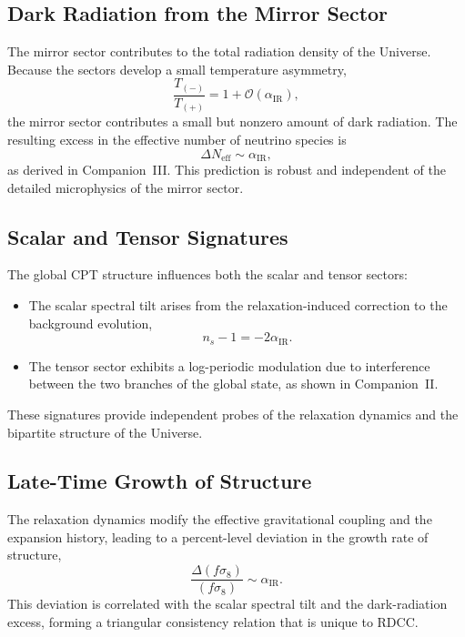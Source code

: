 \documentclass[11pt,a4paper]{article}
\begin{document}
\subsection{Dark Radiation from the Mirror Sector}

The mirror sector contributes to the total radiation density of the Universe. Because the sectors develop a small temperature asymmetry,
\begin{equation}
    \frac{T_{(-)}}{T_{(+)}} = 1 + \mathcal{O}(\alpha_{\mathrm{IR}}),
\end{equation}
the mirror sector contributes a small but nonzero amount of dark radiation. The resulting excess in the effective number of neutrino species is
\begin{equation}
    \Delta N_{\mathrm{eff}} \sim \alpha_{\mathrm{IR}},
\end{equation}
as derived in Companion~III. This prediction is robust and independent of the detailed microphysics of the mirror sector.

\subsection{Scalar and Tensor Signatures}

The global CPT structure influences both the scalar and tensor sectors:
\begin{itemize}
    \item The scalar spectral tilt arises from the relaxation-induced correction to the background evolution,
    \begin{equation}
        n_s - 1 = -2\alpha_{\mathrm{IR}}.
    \end{equation}
    \item The tensor sector exhibits a log-periodic modulation due to interference between the two branches of the global state, as shown in Companion~II.
\end{itemize}
These signatures provide independent probes of the relaxation dynamics and the bipartite structure of the Universe.

\subsection{Late-Time Growth of Structure}

The relaxation dynamics modify the effective gravitational coupling and the expansion history, leading to a percent-level deviation in the growth rate of structure,
\begin{equation}
    \frac{\Delta(f\sigma_8)}{(f\sigma_8)} \sim \alpha_{\mathrm{IR}}.
\end{equation}
This deviation is correlated with the scalar spectral tilt and the dark-radiation excess, forming a triangular consistency relation that is unique to RDCC.
\end{document}
